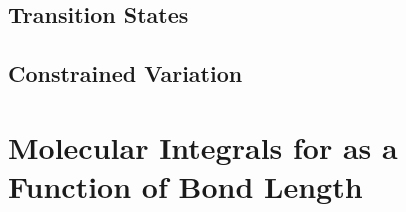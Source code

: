\documentclass[a4paper]{article}
\numberwithin{equation}{section}
\begin{document}
\subsection{Transition States}

\subsection{Constrained Variation}

\section{Molecular Integrals for  as a Function of Bond Length}
\end{document}
